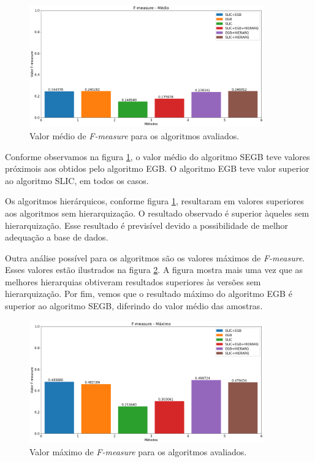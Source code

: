 \begin{document}
\begin{figure}[ht]
\centering
\includegraphics[width=0.9\textwidth]{fmeasure_avg.png}
\caption{Valor médio de \textit{F-measure} para os algoritmos avaliados.}
\label{fig:FMEASURE_AVG}
\end{figure}

Conforme observamos na figura \ref{fig:FMEASURE_AVG}, o valor médio do algoritmo SEGB teve valores próximois aos obtidos pelo algoritmo EGB. O algoritmo EGB teve valor superior ao algoritmo SLIC, em todos os casos.

Os algoritmos hierárquicos, conforme figura \ref{fig:FMEASURE_AVG}, resultaram em valores superiores aos algoritmos sem hierarquização. O resultado observado é superior àqueles sem hierarquização. Esse resultado é previsível devido a possibilidade de melhor adequação a base de dados.

Outra análise possível para os algoritmos são os valores máximos de \textit{F-measure}. Esses valores estão ilustrados na figura \ref{fig:FMEASURE_MAX}. A figura mostra mais uma vez que as melhores hierarquias obtiveram resultados superiores às versões sem hierarquização. Por fim, vemos que o resultado máximo do algoritmo EGB é superior ao algoritmo SEGB, diferindo do valor médio das amostras.

\begin{figure}[ht]
\centering
\includegraphics[width=0.9\textwidth]{fmeasure_max.png}
\caption{Valor máximo de \textit{F-measure} para os algoritmos avaliados.}
\label{fig:FMEASURE_MAX}
\end{figure}
\end{document}
